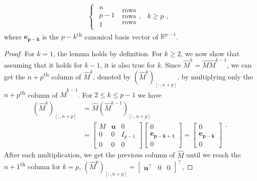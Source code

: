 \begin{lemma}
\begin{equation*}
\begin{cases}
            \begin{matrix} n \\ p-1 \\ 1 \end{matrix}
            \; \begin{matrix} \text{rows} \\ \text{rows} \\ \text{rows} \end{matrix},
            & k \ge p
        \end{cases},
    \end{equation*}
    where $\mathbf{e_{p-k}}$ is the $p-k$\textsuperscript{th} canonical basis vector of $\mathbb{R}^{p-1}$.
\end{lemma}
\begin{proof}
    For $k=1$, the lemma holds by definition. For $k \ge 2$, we now show that assuming
    that it holds for $k-1$, it is also true for $k$.
    Since $\hat{M}^k = \hat{M} \hat{M}^{k-1}$, we can get the $n+p$\textsuperscript{th}
    column of $\hat{M}^k$, denoted by $(\hat{M}^k)_{[:, n+p]}$, by multiplying only
    the $n+p$\textsuperscript{th} column of $\hat{M}^{k-1}$.
    For $2 \le k \le p-1$ we have
    \begin{equation*}
        \begin{aligned}
            (\hat{M}^k)_{[:, n+p]} & = \hat{M} (\hat{M}^{k-1})_{[:, n+p]} \\
            & =
            \begin{bmatrix} M & \mathbf{u} & 0\\ 0 & 0 & I_{p-1}\\ 0 & 0 & 0 \end{bmatrix}
            \begin{bmatrix} 0 \\ \mathbf{e_{p-k+1}} \\ 0 \end{bmatrix}
            =
            \begin{bmatrix} 0 \\ \mathbf{e_{p-k}} \\ 0 \end{bmatrix}
        \end{aligned}.
    \end{equation*}
    After each multiplication, we get the previous column of $\hat{M}$ until we reach
    the $n+1$\textsuperscript{th} column for $k=p$,
    $(\hat{M}^p)_{[:, n+p]} = \begin{bmatrix}\mathbf{u^\top} & 0 & 0\end{bmatrix}^\top$,

\end{proof}
